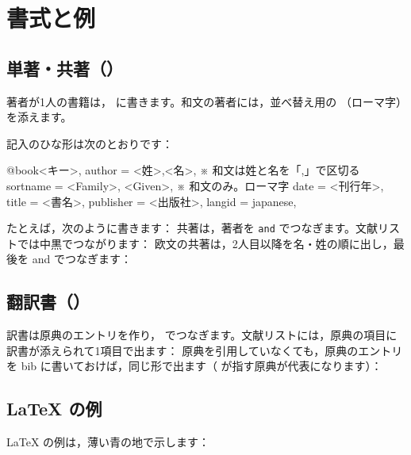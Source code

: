 \section{書式と例}
\subsection{単著・共著（）}
著者が1人の書籍は， に書きます。和文の著者には，並べ替え用の （ローマ字）を添えます。

記入のひな形は次のとおりです：
\begin{bibtemplate}
@book{<キー>,
  author    = {<姓>,<名>},         ※ 和文は姓と名を「,」で区切る
  sortname  = {<Family>, <Given>}, ※ 和文のみ。ローマ字
  date      = {<刊行年>},
  title     = {<書名>},
  publisher = {<出版社>},
  langid    = {japanese},
}
\end{bibtemplate}
たとえば，次のように書きます：
共著は，著者を \texttt{and} でつなぎます。文献リストでは中黒でつながります：
欧文の共著は，2人目以降を名・姓の順に出し，最後を and でつなぎます：

\subsection{翻訳書（）}
訳書は原典のエントリを作り， でつなぎます。文献リストには，原典の項目に訳書が添えられて1項目で出ます：
原典を引用していなくても，原典のエントリを bib に書いておけば，同じ形で出ます（ が指す原典が代表になります）：

\subsection{LaTeX の例}
LaTeX の例は，薄い青の地で示します：

